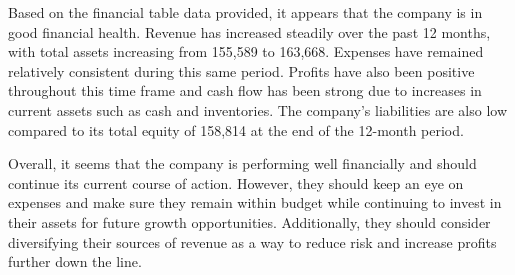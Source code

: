 

Based on the financial table data provided, it appears that the company is in good financial health. Revenue has increased steadily over the past 12 months, with total assets increasing from 155,589 to 163,668. Expenses have remained relatively consistent during this same period. Profits have also been positive throughout this time frame and cash flow has been strong due to increases in current assets such as cash and inventories. The company's liabilities are also low compared to its total equity of 158,814 at the end of the 12-month period. 

Overall, it seems that the company is performing well financially and should continue its current course of action. However, they should keep an eye on expenses and make sure they remain within budget while continuing to invest in their assets for future growth opportunities. Additionally, they should consider diversifying their sources of revenue as a way to reduce risk and increase profits further down the line.